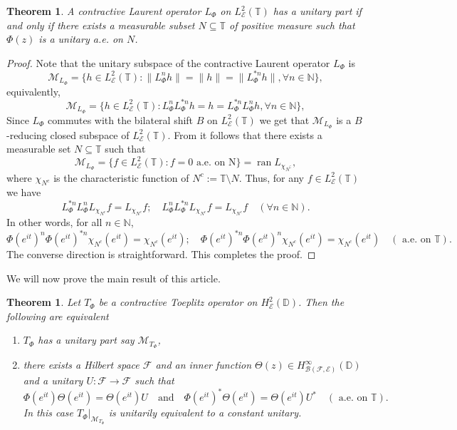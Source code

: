 \documentclass[12pt]{amsart}
\numberwithin{equation}{section}
\newtheorem{thm}[propn]{Theorem}
\theoremstyle{definition}
\newcommand{\Nat}{\mathbb{N}}
\newcommand{\D}{\mathbb{D}}
\newcommand{\T}{\mathbb{T}}
\DeclareMathOperator{\ran}{ran}
\newcommand{\1}{{\mbox{\bf 1}}}
\newcommand{\clb}{\mathcal{B}}
\newcommand{\cle}{\mathcal{E}}
\newcommand{\clf}{\mathcal{F}}
\newcommand{\clm}{\mathcal{M}}
\newcommand{\raro}{\rightarrow}
\begin{document}
\begin{thm}
A contractive Laurent operator $L_{\Phi}$ on $L_{\cle}^2(\T)$ has a unitary part if and only if there exists a measurable subset $N \subseteq \mathbb{T}$ of positive measure such that $\Phi(z)$ is a unitary a.e. on $N$.
\end{thm}
\begin{proof}
Note that the unitary subspace of the contractive Laurent operator $L_{\Phi}$ is 
\[
\clm_{L_{\Phi}} = \{h \in L_{\cle}^2(\T): \|L_{\Phi}^{n}h\| = \|h\| = \|L_{\Phi}^{*n}h\|, \forall n \in \Nat \},
\]
equivalently, 
\[
\clm_{L_{\Phi}} = \{h \in L_{\cle}^2(\T): L_{\Phi}^{n} L_{\Phi}^{*n}h = h = L_{\Phi}^{*n} L_{\Phi}^{n} h, \forall n \in \Nat \},
\]
Since $L_{\Phi}$ commutes with the bilateral shift $B$ on $L_{\cle}^2(\T)$ we get that $\clm_{L_{\Phi}}$ is a $B$-reducing closed subspace of $L_{\cle}^2(\mathbb{T})$. From \cite[Theorem 3.6, Page 39]{RR} it follows that there exists a measurable set $N \subseteq \T$ such that
\[
\clm_{L_{\Phi}} = \{f \in L_{\cle}^2(\T): f = 0 \text{ a.e. on N} \} = \ran L_{\chi_{N^{\complement}}},
\]
where $\chi_{N^{c}}$ is the characteristic function of $N^c:= \T \setminus N$. Thus, for any $f \in L_{\cle}^2(\T)$ we have
\[
L_{\Phi}^{*n} L_{\Phi}^{n}  L_{\chi_{N^c}} f= L_{\chi_{N^c}}f; \quad L_{\Phi}^{n}  L_{\Phi}^{*n} L_{\chi_{N^c}} f= L_{\chi_{N^c}}f \quad (\forall n \in \Nat).
\]
In other words,  for all $n \in \Nat$,
\[
\Phi(e^{it})^{n} \Phi(e^{it})^{*n} \chi_{N^c}(e^{it}) = \chi_{N^c}(e^{it}) ; \quad \Phi(e^{it})^{*n} \Phi(e^{it})^n \chi_{N^c}(e^{it}) = \chi_{N^c}(e^{it}) \quad (\text{ a.e. on } \mathbb{T}).
\]
The converse direction is straightforward. This completes the proof.
\end{proof}
We will now prove the main result of this article.
\begin{thm}\label{mainthm}
Let $T_{\Phi}$ be a contractive Toeplitz operator on $H_{\cle}^2(\D)$.  Then the following are equivalent
\begin{enumerate}
\item[(i)] $T_{\Phi}$ has a unitary part say $\clm_{T_{\Phi}}$,
\item[(ii)] there exists a Hilbert space $\clf$ and an inner function $\Theta(z) \in H_{\clb(\clf,\cle)}^{\infty}(\D)$ and a unitary $U: \clf \raro \clf$ such that
\begin{equation}\label{maincondn}
\Phi(e^{it}) \Theta(e^{it}) = \Theta(e^{it}) U \quad \text{and} \quad  \Phi(e^{it})^* \Theta(e^{it}) = \Theta(e^{it}) U^* \quad (\text{ a.e. on }\T).
\end{equation}
In this case $T_{\Phi}|_{\clm_{T_{\Phi}}}$ is unitarily equivalent to a constant unitary.
\end{enumerate} 
\end{thm}
\end{document}
